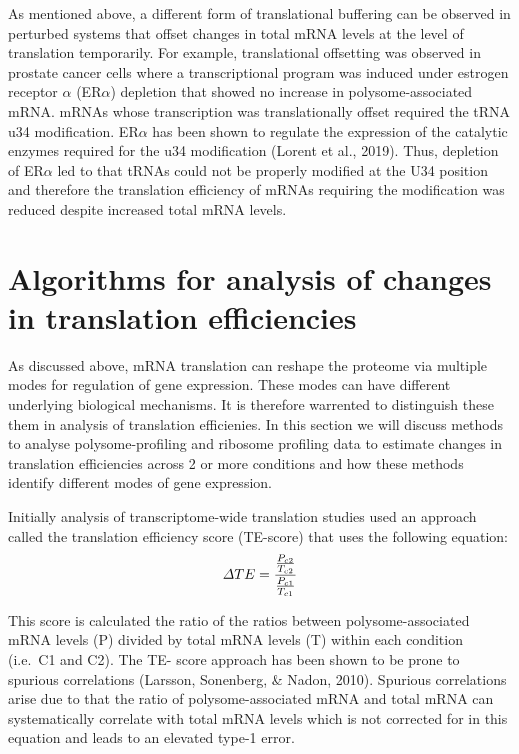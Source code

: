 \documentclass[12pt,openany]{book}
\begin{document}
As mentioned above, a different form of translational buffering can be
observed in perturbed systems that offset changes in total mRNA levels
at the level of translation temporarily. For example, translational
offsetting was observed in prostate cancer cells where a transcriptional
program was induced under estrogen receptor \(\alpha\) (ER\(\alpha\))
depletion that showed no increase in polysome-associated mRNA. mRNAs
whose transcription was translationally offset required the tRNA u34
modification. ER\(\alpha\) has been shown to regulate the expression of
the catalytic enzymes required for the u34 modification (Lorent et al.,
2019). Thus, depletion of ER\(\alpha\) led to that tRNAs could not be
properly modified at the U34 position and therefore the translation
efficiency of mRNAs requiring the modification was reduced despite
increased total mRNA levels. \newline
\section{Algorithms for analysis of changes in translation efficiencies}\label{algorithm}

As discussed above, mRNA translation can reshape the proteome via
multiple modes for regulation of gene expression. These modes can have
different underlying biological mechanisms. It is therefore warrented to
distinguish these them in analysis of translation efficienies. In this
section we will discuss methods to analyse polysome-profiling and
ribosome profiling data to estimate changes in translation efficiencies
across 2 or more conditions and how these methods identify different
modes of gene expression.

Initially analysis of transcriptome-wide translation studies used an
approach called the translation efficiency score (TE-score) that uses
the following equation:
\[\varDelta TE = \frac{\frac{P_{c2}}{T_{c2}}} {\frac{P_{c1}}{T_{c1}}}\\\]

This score is calculated the ratio of the ratios between
polysome-associated mRNA levels (P) divided by total mRNA levels (T)
within each condition (i.e.~C1 and C2). The TE- score approach has been
shown to be prone to spurious correlations (Larsson, Sonenberg, \&
Nadon, 2010). Spurious correlations arise due to that the ratio of
polysome-associated mRNA and total mRNA can systematically correlate
with total mRNA levels which is not corrected for in this equation and
leads to an elevated type-1 error.
\end{document}
